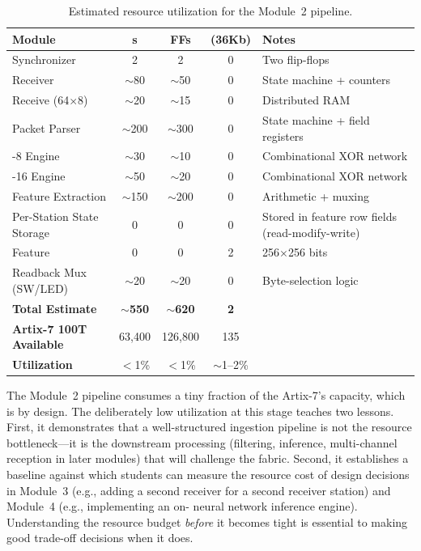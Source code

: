\documentclass[11pt,letterpaper]{article}
\begin{document}
	\begin{table}[ht!]
		\centering
		\caption{Estimated resource utilization for the Module~2 pipeline.}
		\label{tab:resources}
		\renewcommand{\arraystretch}{1.3}
		\begin{tabularx}{\textwidth}{l c c c X}
			\toprule
			\textbf{Module} & \textbf{\LUT{}s} & \textbf{FFs} & \textbf{\BRAM{} (36Kb)} & \textbf{Notes} \\
			\midrule
			Synchronizer & 2 & 2 & 0 & Two flip-flops \\
			\UART{} Receiver & $\sim$80 & $\sim$50 & 0 & State machine + counters \\
			Receive \FIFO{} (64$\times$8) & $\sim$20 & $\sim$15 & 0 & Distributed RAM \\
			Packet Parser & $\sim$200 & $\sim$300 & 0 & State machine + field registers \\
			\CRC{}-8 Engine & $\sim$30 & $\sim$10 & 0 & Combinational XOR network \\
			\CRC{}-16 Engine & $\sim$50 & $\sim$20 & 0 & Combinational XOR network \\
			Feature Extraction & $\sim$150 & $\sim$200 & 0 & Arithmetic + muxing \\
			Per-Station State Storage & 0 & 0 & 0 & Stored in feature row fields (read-modify-write) \\
			Feature \BRAM{} & 0 & 0 & 2 & 256$\times$256 bits \\
			Readback Mux (SW/LED) & $\sim$20 & $\sim$20 & 0 & Byte-selection logic \\
			\midrule
			\textbf{Total Estimate} & $\sim$\textbf{550} & $\sim$\textbf{620} & \textbf{2} & \\
			\textbf{Artix-7 100T Available} & 63,400 & 126,800 & 135 & \\
			\textbf{Utilization} & $<$1\% & $<$1\% & $\sim$1--2\% & \\
			\bottomrule
		\end{tabularx}
	\end{table}

	\begin{tcolorbox}[infobox={Why Resource Awareness Matters at $<$1\%}]
		The Module~2 pipeline consumes a tiny fraction of the Artix-7's capacity, which is by design. The deliberately low utilization at this stage teaches two lessons. First, it demonstrates that a well-structured ingestion pipeline is not the resource bottleneck---it is the downstream processing (filtering, inference, multi-channel reception in later modules) that will challenge the fabric. Second, it establishes a baseline against which students can measure the resource cost of design decisions in Module~3 (e.g., adding a second \UART{} receiver for a second receiver station) and Module~4 (e.g., implementing an on-\FPGA{} neural network inference engine). Understanding the resource budget \emph{before} it becomes tight is essential to making good trade-off decisions when it does.
	\end{tcolorbox}
\end{document}
